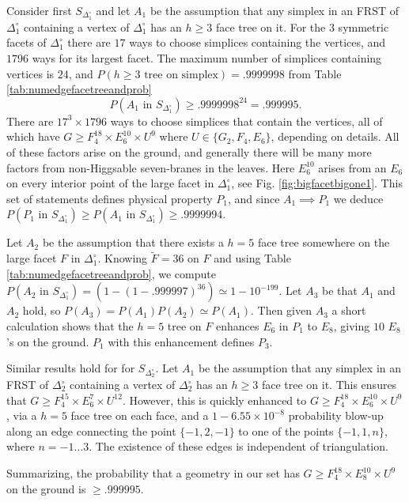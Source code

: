 \documentclass[aps,prl,twocolumn, superscriptaddress,groupedaddress,nofootinbib]{revtex4-1}
\newcommand{\sdoc}{S_{\Delta_1^\circ}}
\newcommand{\sdtc}{S_{\Delta_2^\circ}}
\newcommand{\doc}{{\Delta_1^\circ}}
\newcommand{\dtc}{{\Delta_2^\circ}}
\newcommand{\textin}{\,\, \text{in} \,\,}
\begin{document}
Consider first $\sdoc$ and let $A_1$ be the assumption that any simplex in an FRST 
of $\doc$ containing a vertex of $\doc$ has an $h\geq 3$ face tree on it. 
For the $3$ symmetric facets of $\doc$ there are $17$ ways to choose simplices
containing the vertices, and $1796$ ways for its largest facet. The maximum
number of simplices containing vertices is $24$, and $P(h\geq 3 \,\, \text{tree on simplex}) = .9999998$ from Table \ref{tab:numedgefacetreeandprob}
\begin{equation}
P(A_1\textin\sdoc)\geq .9999998^{24}=.999995.
\end{equation}
There are $17^3\times1796$ ways to choose simplices that contain the vertices,
all of which have $G\geq F_4^{18}\times E_6^{10}\times U^9$ where 
$U\in\{G_2,F_4,E_6\}$, depending on details. All of these factors arise on
the ground, and generally there will be many more factors from non-Higgsable seven-branes
in the leaves. Here $E_6^{10}$ arises from an $E_6$ on every interior point
of the large facet in $\doc$, see Fig. \ref{fig:bigfacetbigone1}. This set of
statements defines physical property $P_1$, and since $A_1\implies P_1$
we deduce $P(P_1\textin \sdoc)\geq P(A_1\textin \sdoc) \geq .9999994$.

Let $A_2$ be the assumption that there exists a $h=5$ face tree somewhere
on the large facet $F$ in $\doc$. Knowing $\tilde F=36$ on $F$ and using
Table \ref{tab:numedgefacetreeandprob}, we compute $P(A_2 \textin \sdoc)=(1-(1-.999997)^{36})\simeq 1-10^{-199}.$ Let $A_3$ be that $A_1$ and $A_2$ hold, so 
$P(A_3)=P(A_1)P(A_2)\simeq P(A_1)$. Then given $A_3$ a short calculation shows 
that the  $h=5$ tree on $F$ 
enhances $E_6$ in $P_1$ to $E_8$, giving $10$ $E_8$'s on the ground. $P_1$ with this enhancement defines $P_3$. 

Similar results hold for for $\sdtc$. Let $A_1$ be the assumption that any simplex in an FRST 
of $\dtc$ containing a vertex of $\dtc$ has an $h\geq 3$ face tree on it. This ensures that $G\geq F_4^{15}\times E_6^{7}\times U^{12}$. However, this is quickly enhanced to  $G\geq F_4^{18}\times E_6^{10}\times U^9$, via a $h=5$ face tree on each face, and a $1-6.55\times 10^{-8}$ probability blow-up along an edge connecting the point $\{-1, 2, -1\}$ to one of the points $\{-1, 1, n\}$, where $n = -1\dots 3$. The existence of these edges is independent of triangulation.

Summarizing, the probability that a geometry in our set has
$G\geq F_4^{18}\times E_8^{10}\times U^9$ on the ground is $\geq .999995$.
\end{document}
